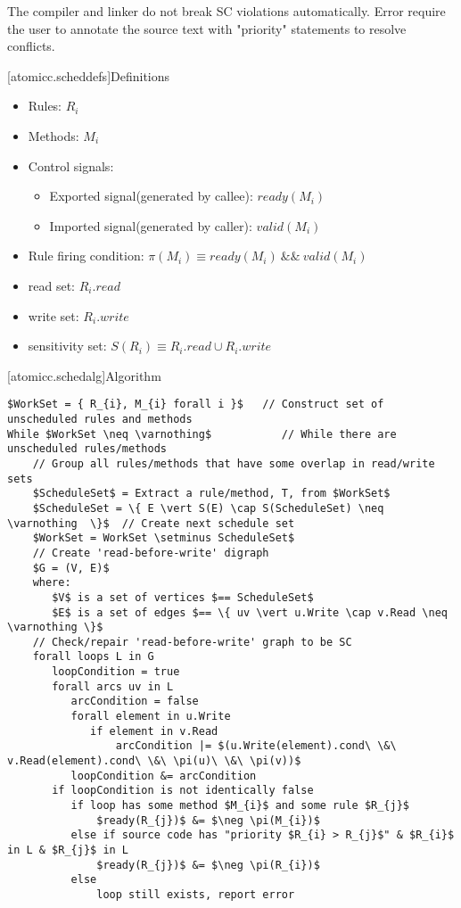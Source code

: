 The compiler and linker do not break SC violations automatically. Error require the user to annotate
the source text with "priority" statements to resolve conflicts.

[atomicc.scheddefs]{Definitions}
\begin{itemize}
\item Rules: $R_{i}$
\item Methods: $M_{i}$
\item Control signals:
\begin {itemize}
\item Exported signal(generated by callee):  $ready(M_{i})$
\item Imported signal(generated by caller):  $valid(M_{i})$
\end{itemize}
\item Rule firing condition: $\pi(M_{i}) \equiv ready(M_{i})\ \&\&\ valid(M_{i})$
\item read set: $R_{i}.read$
\item write set: $R_{i}.write$
\item sensitivity set: $S(R_{i}) \equiv R_{i}.read \cup R_{i}.write$
\end{itemize}
[atomicc.schedalg]{Algorithm}

\begin{lstlisting}[mathescape=true]
$WorkSet = { R_{i}, M_{i} forall i }$   // Construct set of unscheduled rules and methods
While $WorkSet \neq \varnothing$           // While there are unscheduled rules/methods
    // Group all rules/methods that have some overlap in read/write sets
    $ScheduleSet$ = Extract a rule/method, T, from $WorkSet$
    $ScheduleSet = \{ E \vert S(E) \cap S(ScheduleSet) \neq \varnothing  \}$  // Create next schedule set
    $WorkSet = WorkSet \setminus ScheduleSet$
    // Create 'read-before-write' digraph
    $G = (V, E)$
    where: 
       $V$ is a set of vertices $== ScheduleSet$
       $E$ is a set of edges $== \{ uv \vert u.Write \cap v.Read \neq \varnothing \}$
    // Check/repair 'read-before-write' graph to be SC
    forall loops L in G
       loopCondition = true
       forall arcs uv in L 
          arcCondition = false
          forall element in u.Write
             if element in v.Read
                 arcCondition |= $(u.Write(element).cond\ \&\ v.Read(element).cond\ \&\ \pi(u)\ \&\ \pi(v))$
          loopCondition &= arcCondition
       if loopCondition is not identically false
          if loop has some method $M_{i}$ and some rule $R_{j}$
              $ready(R_{j})$ &= $\neg \pi(M_{i})$
          else if source code has "priority $R_{i} > R_{j}$" & $R_{i}$ in L & $R_{j}$ in L
              $ready(R_{j})$ &= $\neg \pi(R_{i})$
          else
              loop still exists, report error
\end{lstlisting}


